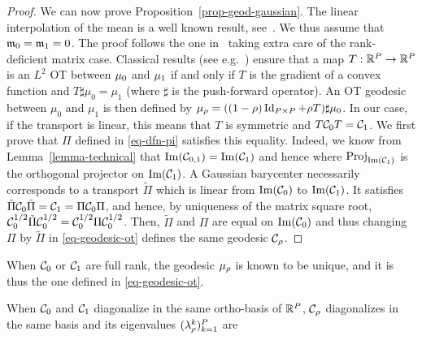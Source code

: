 \begin{proof}
We can now prove Proposition~\ref{prop-geod-gaussian}.
	The linear interpolation of the mean is a well known result, see~\cite{villani-topics}. We thus assume that ${\frak m}_0={\frak m}_1=0$.
	The proof follows the one in~\cite{takatsu-wasserstein-gaussian} taking extra care of the rank-deficient matrix case. Classical results (see e.g.~\cite[Section 2.4]{villani-topics}) ensure that a map $T : \mathbb{R}^{P} \rightarrow \mathbb{R}^P$ is an $L^2$ OT between $\mu_0$ and $\mu_1$ if and only if $T$ is the gradient of a convex function and $T \sharp \mu_0 = \mu_1$ (where $\sharp$ is the push-forward operator). An OT geodesic between $\mu_0$ and $\mu_1$ is then defined by $\mu_\rho = ((1-\rho)\operatorname{Id}_{P \times P} + \rho T) \sharp \mu_0$.	
	In our case, if the transport is linear, this means that $T$ is symmetric and $T \mathcal{C}_0 T = \mathcal{C}_1$. We first prove that $\Pi$ defined in \eqref{eq-dfn-pi} satisfies this equality. Indeed, 
we know from Lemma~\ref{lemma-technical}
that $\operatorname{Im}(\mathcal{C}_{0,1}) = \operatorname{Im}(\mathcal{C}_1)$ and hence
	where $\text{Proj}_{\operatorname{Im}(\mathcal{C}_1)}$ is the orthogonal projector on $\operatorname{Im}(\mathcal{C}_1)$.
	A Gaussian barycenter necessarily corresponds to a transport $\tilde \Pi$ which is linear
	from $\operatorname{Im}(\mathcal{C}_0)$ to $\operatorname{Im}(\mathcal{C}_1)$.
	It satisfies $\tilde \Pi \mathcal{C}_0 \tilde \Pi = \mathcal{C}_1 = \Pi \mathcal{C}_0 \Pi$, and hence,
	by uniqueness of the matrix square root, $\mathcal{C}_0^{1/2} \tilde\Pi \mathcal{C}_0^{1/2} = \mathcal{C}_0^{1/2} \Pi \mathcal{C}_0^{1/2}$. Then, $\tilde \Pi$ and $\Pi$ are equal on $\operatorname{Im}(\mathcal{C}_0)$ and thus changing $\Pi$ by $\tilde \Pi$ in \eqref{eq-geodesic-ot} defines the same geodesic $\mathcal{C}_\rho$.
\end{proof}

When $\mathcal{C}_0$ or $\mathcal{C}_1$ are full rank, the geodesic $\mu_\rho$ is known to be unique, and it is thus the one defined in \eqref{eq-geodesic-ot}. 

When $\mathcal{C}_0$ and $\mathcal{C}_1$ diagonalize in the same ortho-basis of $\mathbb{R}^P$, $\mathcal{C}_\rho$ diagonalizes in the same basis and its eigenvalues $(\lambda_\rho^k)_{k=1}^P$ are

